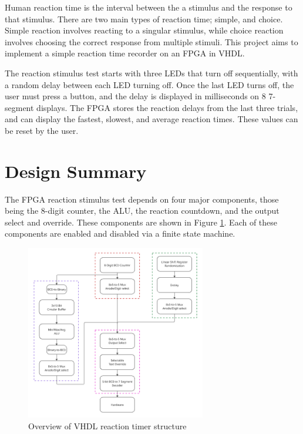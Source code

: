 \documentclass[11pt]{article}
\begin{document}
Human reaction time is the interval between the a stimulus and the response to that stimulus. There are two main types of reaction time; simple, and choice. Simple reaction involves reacting to a singular stimulus, while choice reaction involves choosing the correct response from multiple stimuli. This project aims to implement a simple reaction time recorder on an FPGA in VHDL.

The reaction stimulus test starts with three LEDs that turn off sequentially, with a random delay between each LED turning off. Once the last LED turns off, the user must press a button, and the delay is displayed in milliseconds on 8 7-segment displays. The FPGA stores the reaction delays from the last three trials, and can display the fastest, slowest, and average reaction times. These values can be reset by the user.

\section{Design Summary}

The FPGA reaction stimulus test depends on four major components, those being the 8-digit counter, the ALU, the reaction countdown, and the output select and override. These components are shown in Figure \ref{project_structure}. Each of these components are enabled and disabled via a finite state machine.

\begin{figure}[H]
  \centering
  \includegraphics[width=0.7\textwidth]{project_overall_structure.png}
  \caption{Overview of VHDL reaction timer structure}
  \label{project_structure}
\end{figure}
\end{document}
